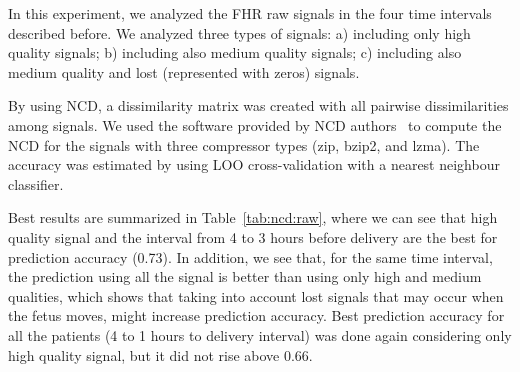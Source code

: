 In this experiment, we analyzed the FHR raw signals in the four time intervals described before. We analyzed three types of signals: a)  including only high quality signals; b) including also medium quality signals; c)  including also medium quality and lost (represented with zeros) signals.

By using NCD, a dissimilarity matrix was created with all pairwise dissimilarities among signals.  We used the software provided by NCD authors~\cite{complearn} to compute the NCD for the signals with three compressor types (zip, bzip2, and lzma). The accuracy was estimated by using LOO cross-validation with a nearest neighbour classifier. 


Best results are summarized in Table~\ref{tab:ncd:raw}, where we can see that high quality signal and the interval from 4 to 3 hours before delivery are the best for prediction accuracy (0.73). In addition, we see that, for the same time interval, the prediction using all the signal is better than using only high and medium qualities, which shows that taking into account lost signals that may occur when the fetus moves, might increase prediction accuracy. Best prediction accuracy for all the patients (4 to 1 hours to delivery interval) was done again considering only high quality signal, but it did not rise above 0.66.

